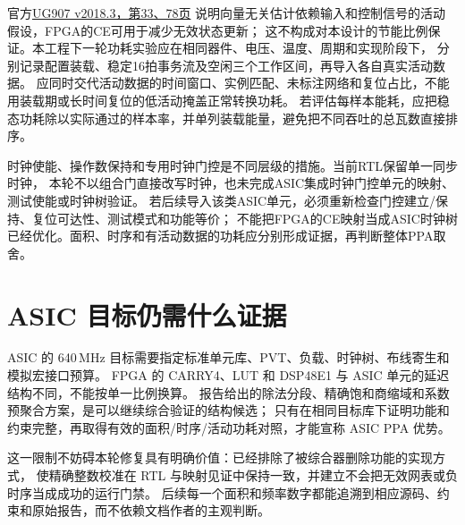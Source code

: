 官方\href{https://docs.amd.com/v/u/2018.3-English/ug907-vivado-power-analysis-optimization}{UG907 v2018.3，第33、78页}
说明向量无关估计依赖输入和控制信号的活动假设，FPGA的CE可用于减少无效状态更新；
这不构成对本设计的节能比例保证。本工程下一轮功耗实验应在相同器件、电压、温度、周期和实现阶段下，
分别记录配置装载、稳定16拍事务流及空闲三个工作区间，再导入各自真实活动数据。
应同时交代活动数据的时间窗口、实例匹配、未标注网络和复位占比，不能用装载期或长时间复位的低活动掩盖正常转换功耗。
若评估每样本能耗，应把稳态功耗除以实际通过的样本率，并单列装载能量，避免把不同吞吐的总瓦数直接排序。

时钟使能、操作数保持和专用时钟门控是不同层级的措施。当前RTL保留单一同步时钟，
本轮不以组合门直接改写时钟，也未完成ASIC集成时钟门控单元的映射、测试使能或时钟树验证。
若后续导入该类ASIC单元，必须重新检查门控建立/保持、复位可达性、测试模式和功能等价；
不能把FPGA的CE映射当成ASIC时钟树已经优化。面积、时序和有活动数据的功耗应分别形成证据，再判断整体PPA取舍。



\section{ASIC 目标仍需什么证据}
ASIC 的 640\,MHz 目标需要指定标准单元库、PVT、负载、时钟树、布线寄生和模拟宏接口预算。
FPGA 的 CARRY4、LUT 和 DSP48E1 与 ASIC 单元的延迟结构不同，不能按单一比例换算。
报告给出的除法分段、精确饱和商缩域和系数预聚合方案，是可以继续综合验证的结构候选；
只有在相同目标库下证明功能和约束完整，再取得有效的面积/时序/活动功耗对照，才能宣称 ASIC PPA 优势。

这一限制不妨碍本轮修复具有明确价值：已经排除了被综合器删除功能的实现方式，
使精确整数校准在 RTL 与映射见证中保持一致，并建立不会把无效网表或负时序当成成功的运行门禁。
后续每一个面积和频率数字都能追溯到相应源码、约束和原始报告，而不依赖文档作者的主观判断。
